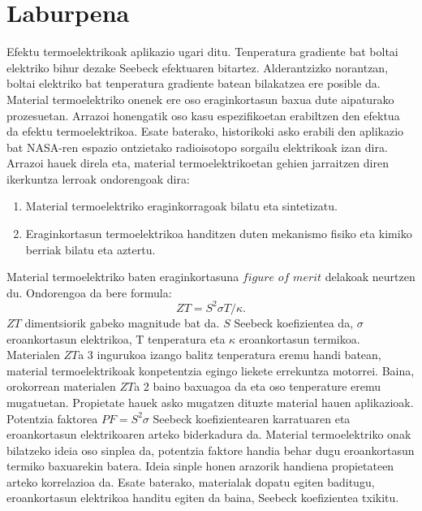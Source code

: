 
\chapter*{Laburpena} %

Efektu termoelektrikoak aplikazio ugari ditu. Tenperatura gradiente bat boltai elektriko bihur dezake Seebeck 
efektuaren bitartez. Alderantzizko norantzan, boltai elektriko bat tenperatura gradiente batean bilakatzea ere 
posible da. Material termoelektriko onenek ere oso eraginkortasun baxua dute aipaturako prozesuetan. Arrazoi 
honengatik oso kasu espezifikoetan erabiltzen den efektua da efektu termoelektrikoa. Esate baterako, historikoki 
asko erabili den aplikazio bat NASA-ren espazio ontzietako radioisotopo sorgailu elektrikoak izan dira. Arrazoi 
hauek direla eta, material termoelektrikoetan gehien jarraitzen diren ikerkuntza lerroak ondorengoak dira:
\begin{enumerate}
\item Material termoelektriko eraginkorragoak bilatu eta sintetizatu.
\item Eraginkortasun termoelektrikoa handitzen duten mekanismo fisiko eta kimiko berriak bilatu eta aztertu. 
\end{enumerate}
Material termoelektriko baten eraginkortasuna $figure$ $of$ $merit$ delakoak neurtzen du. Ondorengoa da bere formula:
\begin{equation}
\nonumber
ZT=S^{2}\sigma T/\kappa.
\end{equation}
$ZT$ dimentsiorik gabeko magnitude bat da. $S$ Seebeck koefizientea da, $\sigma$ eroankortasun elektrikoa, T 
tenperatura eta $\kappa$ eroankortasun termikoa. Materialen $ZT$a 3 ingurukoa izango balitz tenperatura eremu handi 
batean, material termoelektrikoak konpetentzia egingo liekete errekuntza motorrei. Baina, orokorrean materialen $ZT$a 
2 baino baxuagoa da eta oso tenperature eremu mugatuetan. Propietate hauek asko mugatzen dituzte material hauen 
aplikazioak. \\

Potentzia faktorea $PF=S^{2}\sigma$ Seebeck koefizientearen karratuaren eta eroankortasun elektrikoaren arteko
biderkadura da. Material termoelektriko onak bilatzeko ideia oso sinplea da, potentzia faktore handia behar dugu 
eroankortasun termiko baxuarekin batera. Ideia sinple honen arazorik handiena propietateen arteko korrelazioa da. 
Esate baterako, materialak dopatu egiten baditugu, eroankortasun elektrikoa handitu egiten da baina, Seebeck 
koefizientea txikitu. \\

